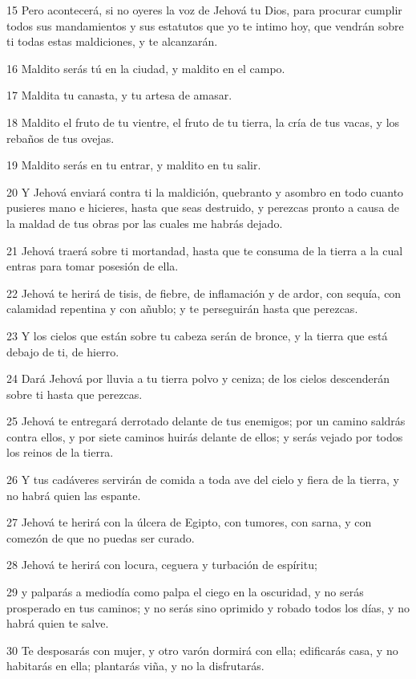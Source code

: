 \par 15 Pero acontecerá, si no oyeres la voz de Jehová tu Dios, para procurar cumplir todos sus mandamientos y sus estatutos que yo te intimo hoy, que vendrán sobre ti todas estas maldiciones, y te alcanzarán.
\par 16 Maldito serás tú en la ciudad, y maldito en el campo.
\par 17 Maldita tu canasta, y tu artesa de amasar.
\par 18 Maldito el fruto de tu vientre, el fruto de tu tierra, la cría de tus vacas, y los rebaños de tus ovejas.
\par 19 Maldito serás en tu entrar, y maldito en tu salir.
\par 20 Y Jehová enviará contra ti la maldición, quebranto y asombro en todo cuanto pusieres mano e hicieres, hasta que seas destruido, y perezcas pronto a causa de la maldad de tus obras por las cuales me habrás dejado.
\par 21 Jehová traerá sobre ti mortandad, hasta que te consuma de la tierra a la cual entras para tomar posesión de ella.
\par 22 Jehová te herirá de tisis, de fiebre, de inflamación y de ardor, con sequía, con calamidad repentina y con añublo; y te perseguirán hasta que perezcas.
\par 23 Y los cielos que están sobre tu cabeza serán de bronce, y la tierra que está debajo de ti, de hierro.
\par 24 Dará Jehová por lluvia a tu tierra polvo y ceniza; de los cielos descenderán sobre ti hasta que perezcas.
\par 25 Jehová te entregará derrotado delante de tus enemigos; por un camino saldrás contra ellos, y por siete caminos huirás delante de ellos; y serás vejado por todos los reinos de la tierra.
\par 26 Y tus cadáveres servirán de comida a toda ave del cielo y fiera de la tierra, y no habrá quien las espante.
\par 27 Jehová te herirá con la úlcera de Egipto, con tumores, con sarna, y con comezón de que no puedas ser curado.
\par 28 Jehová te herirá con locura, ceguera y turbación de espíritu;
\par 29 y palparás a mediodía como palpa el ciego en la oscuridad, y no serás prosperado en tus caminos; y no serás sino oprimido y robado todos los días, y no habrá quien te salve.
\par 30 Te desposarás con mujer, y otro varón dormirá con ella; edificarás casa, y no habitarás en ella; plantarás viña, y no la disfrutarás.
